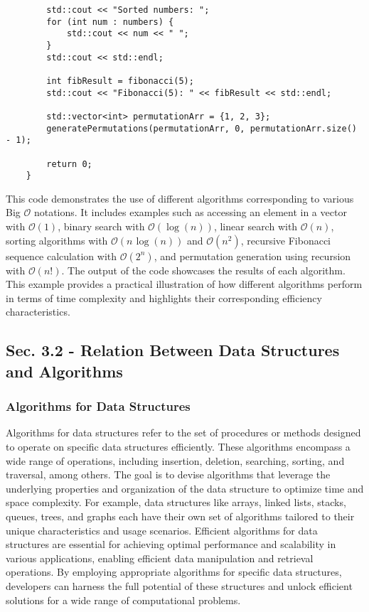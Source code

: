 \begin{solution}
\begin{verbatim}
        std::cout << "Sorted numbers: ";
        for (int num : numbers) {
            std::cout << num << " ";
        }
        std::cout << std::endl;

        int fibResult = fibonacci(5);
        std::cout << "Fibonacci(5): " << fibResult << std::endl;

        std::vector<int> permutationArr = {1, 2, 3};
        generatePermutations(permutationArr, 0, permutationArr.size() - 1);

        return 0;
    }
    \end{verbatim}
    \horizontalline

    \noindent This code demonstrates the use of different algorithms corresponding to various Big $\mathcal{O}$ notations. It includes examples such as accessing an element in a vector with $\mathcal{O}(1)$, binary search with $\mathcal{O}(\log{(n)})$, linear search with $\mathcal{O}(n)$, sorting algorithms with $\mathcal{O}(n\hspace{1pt}\log{(n)})$ and $\mathcal{O}(n^2)$, recursive Fibonacci sequence calculation with $\mathcal{O}(2^n)$, 
    and permutation generation using recursion with $\mathcal{O}(n!)$. The output of the code showcases the results of each algorithm. This example provides a practical illustration of how different algorithms perform in terms of time complexity and highlights their corresponding efficiency characteristics. \\
\end{solution}

\subsection*{Sec. 3.2 - Relation Between Data Structures and Algorithms}
\subsubsection*{Algorithms for Data Structures}

Algorithms for data structures refer to the set of procedures or methods designed to operate on specific data structures efficiently. These algorithms encompass a wide range of operations, including insertion, deletion, searching, sorting, and traversal, among others. The goal is to devise algorithms that leverage the underlying properties and organization of the data structure to optimize time and space complexity. For example, data structures 
like arrays, linked lists, stacks, queues, trees, and graphs each have their own set of algorithms tailored to their unique characteristics and usage scenarios. Efficient algorithms for data structures are essential for achieving optimal performance and scalability in various applications, enabling efficient data manipulation and retrieval operations. By employing appropriate algorithms for specific data structures, developers can harness the 
full potential of these structures and unlock efficient solutions for a wide range of computational problems. \\

